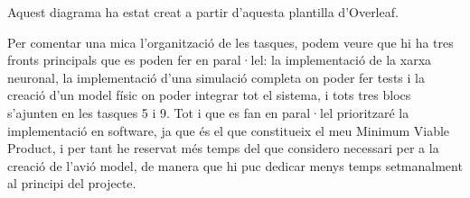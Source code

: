 \documentclass[10pt,a4paper,twocolumn,twoside]{article}
\begin{document}
Aquest diagrama ha estat creat a partir d'aquesta plantilla \cite{GanttLatex} d'Overleaf.

Per comentar una mica l'organització de les tasques, podem veure que hi ha tres fronts principals que es poden fer en paral·lel: la implementació de la xarxa neuronal, la implementació d'una simulació completa on poder fer tests i la creació d'un model físic on poder integrar tot el sistema, i tots tres blocs s'ajunten en les tasques 5 i 9. Tot i que es fan en paral·lel prioritzaré la implementació en software, ja que és el que constitueix el meu Minimum Viable Product, i per tant he reservat més temps del que considero necessari per a la creació de l'avió model, de manera que hi puc dedicar menys temps setmanalment al principi del projecte.


\renewcommand\sfdefault{phv}
\renewcommand\mddefault{mc}
\renewcommand\bfdefault{bc}
\sffamily
\end{document}
